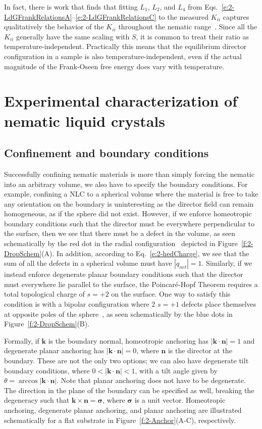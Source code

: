 In fact, there is work that finds that fitting $L_1$, $L_2$, and $L_4$ from Eqs.~\ref{e:2-LdGFrankRelationsA}--\ref{e:2-LdGFrankRelationsC} to the measured $K_{ii}$ captures qualitatively the behavior of the $K_{ii}$ throughout the nematic range~\cite{RN198}.
Since all the $K_{ii}$ generally have the same scaling with $S$, it is common to treat their ratio as temperature-independent.
Practically this means that the equilibrium director configuration in a sample is also temperature-independent, even if the actual magnitude of the Frank-Oseen free energy does vary with temperature.




\section{Experimental characterization of nematic liquid crystals}
\subsection{Confinement and boundary conditions}
Successfully confining nematic materials is more than simply forcing the nematic into an arbitrary volume, we also have to specify the boundary conditions.
For example, confining a NLC to a spherical volume where the material is free to take any orientation on the boundary is uninteresting as the director field can remain homogeneous, as if the sphere did not exist.
However, if we enforce homeotropic boundary conditions such that the director must be everywhere perpendicular to the surface, then we see that there must be a defect in the volume, as seen schematically by the red dot in the radial configuration~\cite{RN177} depicted in Figure~\ref{f:2-DropSchem}(A).
In addition, according to Eq.~\ref{e:2-hedCharge}, we see that the sum of all the defects in a spherical volume must have $|q_{net}| = 1$.
Similarly, if we instead enforce degenerate planar boundary conditions such that the director must everywhere lie parallel to the surface, the Poincar\'e-Hopf Theorem requires a total topological charge of $s = +2$ on the surface.
One way to satisfy this condition is with a bipolar configuration where 2 $s = +1$ defects place themselves at opposite poles of the sphere~\cite{RN177}, as seen schematically by the blue dots in Figure~\ref{f:2-DropSchem}(B).

Formally, if $\mathbf{k}$ is the boundary normal, homeotropic anchoring has $|\mathbf{k} \cdot \mathbf{n}| = 1$ and degenerate planar anchoring has $|\mathbf{k} \cdot \mathbf{n}| = 0$, where $\mathbf{n}$ is the director at the boundary.
These are not the only two options; we can also have degenerate tilt boundary conditions, where $0< |\mathbf{k} \cdot \mathbf{n}| < 1$, with a tilt angle given by $\theta = \arccos |\mathbf{k} \cdot \mathbf{n}| $.
Note that planar anchoring does not have to be degenerate.
The direction in the plane of the boundary can be specified as well, breaking the degeneracy such that $\mathbf{k} \times \mathbf{n} = \bm{\sigma}$, where $\bm{\sigma}$ is a unit vector.
Homeotropic anchoring, degenerate planar anchoring, and planar anchoring are illustrated schematically for a flat substrate in Figure~\ref{f:2-Anchor}(A-C), respectively.

